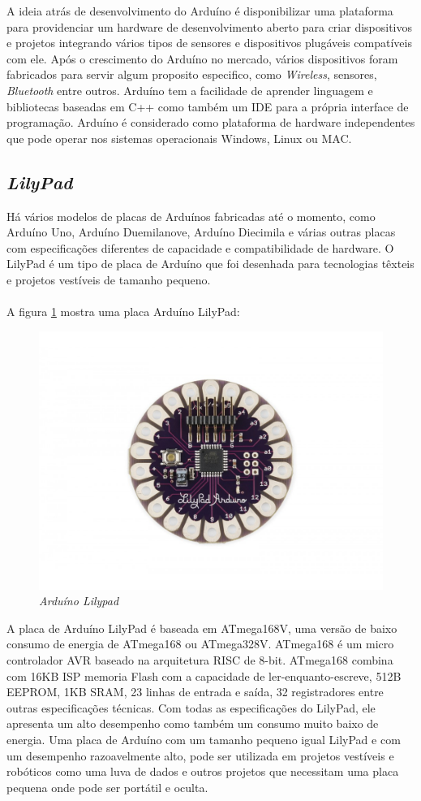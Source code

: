 \documentclass[12pt]{article}
\begin{document}
A ideia atrás de desenvolvimento do Arduíno é disponibilizar uma plataforma para providenciar um hardware de desenvolvimento aberto para criar dispositivos e projetos integrando vários tipos de sensores e dispositivos plugáveis compatíveis com ele.  Após o crescimento do Arduíno no mercado, vários dispositivos foram fabricados para servir algum proposito especifico, como \textit{Wireless}, sensores, \textit{Bluetooth} entre outros.  Arduíno tem a facilidade de aprender linguagem e bibliotecas baseadas em C++ como também um IDE para a própria interface de programação. Arduíno é considerado como plataforma de hardware independentes que pode operar nos sistemas operacionais Windows, Linux ou MAC.

\subsection{\textit{LilyPad}}

Há vários modelos de placas de Arduínos fabricadas até o momento, como Arduíno Uno, Arduíno Duemilanove, Arduíno Diecimila e várias outras placas com especificações diferentes de capacidade e compatibilidade de hardware. O LilyPad \cite{Buechley_2008} é um tipo de placa de Arduíno que foi desenhada para tecnologias têxteis e projetos vestíveis de tamanho pequeno.
\\ \\A figura \ref{fig:lilypad} mostra uma placa Arduíno LilyPad:
\begin{figure}[H]
    \centering
    \includegraphics[width=.7\textwidth]{images/lilypad_img.jpg}
    \caption{\textit{Arduíno Lilypad}}
    \label{fig:lilypad}
\end{figure}


A placa de Arduíno LilyPad é baseada em ATmega168V, uma versão de baixo consumo de energia de ATmega168 ou ATmega328V. ATmega168 é um micro controlador AVR baseado na arquitetura RISC de 8-bit. ATmega168 combina com 16KB ISP memoria Flash com a capacidade de ler-enquanto-escreve, 512B EEPROM, 1KB SRAM, 23 linhas de entrada e saída, 32 registradores entre outras especificações técnicas.  Com todas as especificações do LilyPad, ele apresenta um alto desempenho como também um consumo muito baixo de energia.  Uma placa de Arduíno com um tamanho pequeno igual LilyPad e com um desempenho razoavelmente alto, pode ser utilizada em projetos vestíveis e robóticos como uma luva de dados e outros projetos que necessitam uma placa pequena onde pode ser portátil e oculta.



\end{document}
